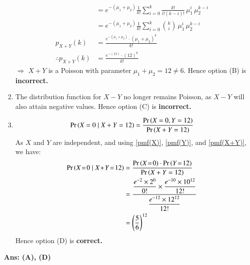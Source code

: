 \documentclass[journal,12pt,twocolumn]{IEEEtran}
\begin{document}
\begin{enumerate}[label=\textbf{(\Alph*)}]
\begin{align}
        &= e^{-(\mu_1 + \mu_2)}\frac 1{k!}\sum_{i=0}^k \frac{k!}{i!(k-i)!}\,\mu_1^i\,\mu_2^{k-i}\\
        &= e^{-(\mu_1 + \mu_2)}\frac 1{k!}\sum_{i=0}^k {k\choose i}\, \mu_1^i\,\mu_2^{k-i}\\
        p_{X+Y}(k) &= \frac{e^{-(\mu_1 + \mu_2)} \cdot (\mu_1 + \mu_2)^k}{k!} \\
        \therefore p_{X+Y}(k) &= \frac{e^{-(12)} \cdot (12)^k}{k!}\label{pmf(X+Y)}
    \end{align}
    $\Rightarrow$  $X+ Y$ is a Poisson with parameter $\mu_1 + \mu_2 = 12 \neq 6$. Hence option (B) is \textbf{incorrect.}\\
    \item The distribution function for $X - Y$ no longer remains Poisson, as $X - Y$ will also attain negative values.
    Hence option (C) is \textbf{incorrect.}

    \item \begin{align}
        \Pr\left(X=0\mid X+Y=12\right) = \dfrac{\Pr\left(X=0, Y=12\right)}{\Pr\left(X+Y=12\right)}
    \end{align}
    As $X$ and $Y$ are independent, and using \eqref{pmf(X)}, \eqref{pmf(Y)}, and \eqref{pmf(X+Y)}, we have:
    \begin{align}
        \pr{X\!=\!0\mid X\!+\!Y\!=\!12} &= \frac{\pr{X\!=\!0} \cdot \pr{Y\!=\!12}}{\pr{X+Y=12}} \\
        &= \frac{\dfrac{e^{-2}\times 2^{0}}{0!} \times \dfrac{e^{-10}\times10^{12}}{12!}}{\dfrac{e^{-12}\times12^{12}}{12!}}\\
        &= \left(\dfrac{5}{6}\right)^{12}
    \end{align}
    Hence option (D) is \textbf{correct.}
\end{enumerate}
\textbf{Ans: (A), (D)}
\end{document}
